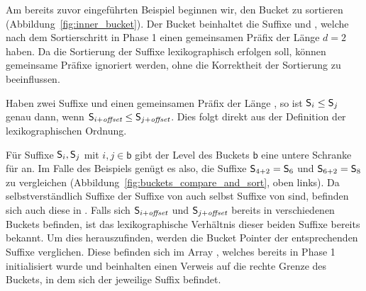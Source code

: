 Am bereits zuvor eingeführten Beispiel beginnen wir, den Bucket  zu sortieren (Abbildung~\ref{fig:inner_bucket}). Der Bucket beinhaltet die Suffixe  und , welche nach dem Sortierschritt in Phase 1 einen gemeinsamen Präfix der Länge \(d = 2\) haben. Da die Sortierung der Suffixe lexikographisch erfolgen soll, können gemeinsame Präfixe ignoriert werden, ohne die Korrektheit der Sortierung zu beeinflussen. 
\begin{lemma}
	\label{lemma:common_prefix}
	\normalfont
    Haben zwei Suffixe  und  einen gemeinsamen Präfix der Länge \offset, so ist \(\mathsf{S}_{i} \leq \mathsf{S}_{j}\) genau dann, wenn \(\mathsf{S}_{i+\textit{offset}} \leq \mathsf{S}_{j+\textit{offset}}\). Dies folgt direkt aus der Definition der lexikographischen Ordnung.
\end{lemma}
Für Suffixe \(\mathsf{S}_{i}, \mathsf{S}_{j}\) mit \(i, j \in \mathsf{b}\) gibt der Level des Buckets \(\mathsf{b}\) eine untere Schranke für \offset an. Im Falle des Beispiels genügt es also, die Suffixe \(\mathsf{S}_{4+2} = \mathsf{S}_{6}\) und \(\mathsf{S}_{6+2} = \mathsf{S}_{8}\) zu vergleichen (Abbildung~\ref{fig:buckets_compare_and_sort}, oben links). Da selbstverständlich Suffixe der Suffixe von  auch selbst Suffixe von  sind, befinden sich auch diese in \sa. Falls  sich \(\mathsf{S}_{i+\textit{offset}}\) und \(\mathsf{S}_{j+\textit{offset}}\) bereits in verschiedenen Buckets befinden, ist das lexikographische Verhältnis dieser beiden Suffixe bereits bekannt. Um dies herauszufinden, werden die Bucket Pointer der entsprechenden Suffixe verglichen. Diese befinden sich im Array \bptr, welches bereits in Phase 1 initialisiert wurde und beinhalten einen Verweis auf die rechte Grenze des Buckets, in dem sich der jeweilige Suffix befindet.\par
